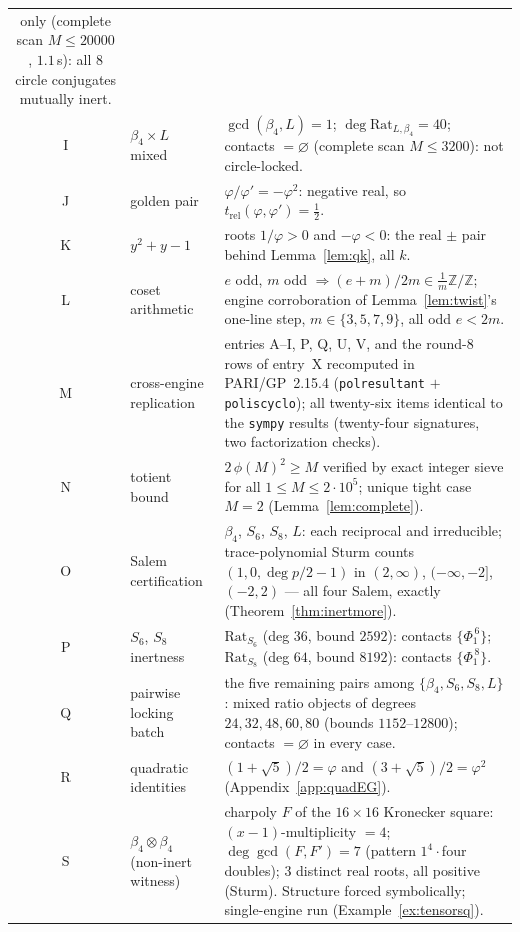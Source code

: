 \documentclass[11pt]{article}
\theoremstyle{plain}
\theoremstyle{definition}
\theoremstyle{remark}
\newcommand{\Z}{\mathbb{Z}}
\newcommand{\Rat}{\mathrm{Rat}}
\begin{document}
\begin{center}
\begin{tabular}{clp{9.2cm}}
only (complete scan $M\le20000$, $1.1$\,s): all $8$ circle conjugates mutually
inert.\\[2pt]
I & $\beta_4\times L$ mixed & $\gcd(\beta_4,L)=1$; $\deg\Rat_{L,\beta_4}=40$;
contacts $=\varnothing$ (complete scan $M\le3200$): not circle-locked.\\[2pt]
J & golden pair & $\varphi/\varphi'=-\varphi^2$: negative real, so
$t_{\mathrm{rel}}(\varphi,\varphi')=\tfrac12$.\\[2pt]
K & $y^2+y-1$ & roots $1/\varphi>0$ and $-\varphi<0$: the real $\pm$ pair
behind Lemma~\ref{lem:qk}, all $k$.\\[2pt]
L & coset arithmetic & $e$ odd, $m$ odd $\Rightarrow(e+m)/2m\in\frac1m\Z/\Z$;
engine corroboration of Lemma~\ref{lem:twist}'s one-line step,
$m\in\{3,5,7,9\}$, all odd $e<2m$.\\[2pt]
M & cross-engine replication & entries A--I, P, Q, U, V, and the round-8
rows of entry~X recomputed in PARI/GP~2.15.4 (\texttt{polresultant} $+$
\texttt{poliscyclo}); all twenty-six items identical to the \texttt{sympy}
results (twenty-four signatures, two factorization checks).\\[2pt]
N & totient bound & $2\,\phi(M)^2\ge M$ verified by exact integer sieve for
all $1\le M\le2\cdot10^{5}$; unique tight case $M=2$
(Lemma~\ref{lem:complete}).\\[2pt]
O & Salem certification & $\beta_4$, $S_6$, $S_8$, $L$: each reciprocal and
irreducible; trace-polynomial Sturm counts $(1,0,\deg p/2-1)$ in
$(2,\infty)$, $(-\infty,-2]$, $(-2,2)$ --- all four Salem, exactly
(Theorem~\ref{thm:inertmore}).\\[2pt]
P & $S_6$, $S_8$ inertness & $\Rat_{S_6}$ (deg $36$, bound $2592$): contacts
$\{\Phi_1^{\,6}\}$; $\Rat_{S_8}$ (deg $64$, bound $8192$): contacts
$\{\Phi_1^{\,8}\}$.\\[2pt]
Q & pairwise locking batch & the five remaining pairs among
$\{\beta_4,S_6,S_8,L\}$: mixed ratio objects of degrees $24,32,48,60,80$
(bounds $1152$--$12800$); contacts $=\varnothing$ in every case.\\[2pt]
R & quadratic identities & $(1+\sqrt5)/2=\varphi$ and
$(3+\sqrt5)/2=\varphi^2$ (Appendix~\ref{app:quadEG}).\\[2pt]
S & $\beta_4\otimes\beta_4$ (non-inert witness) & charpoly $F$ of the
$16\times16$ Kronecker square: $(x-1)$-multiplicity $=4$;
$\deg\gcd(F,F')=7$ (pattern $1^4\cdot$four doubles); $3$ distinct real
roots, all positive (Sturm). Structure forced symbolically; single-engine
run (Example~\ref{ex:tensorsq}).\\[2pt]

\end{tabular}
\end{center}
\end{document}
